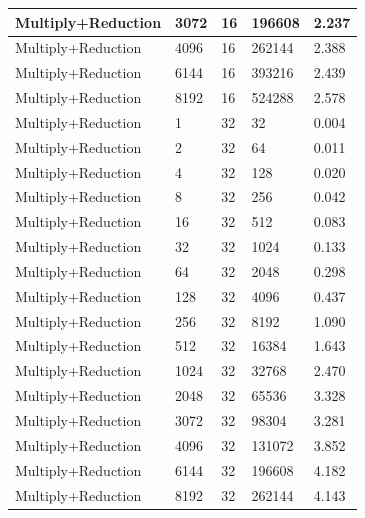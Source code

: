 \documentclass{article}
\begin{document}
\begin{longtable}{|l|l|l|l|l|}
Multiply+Reduction & 3072 & 16          & 196608            & 2.237             \\ \hline
Multiply+Reduction & 4096 & 16          & 262144            & 2.388             \\ \hline
Multiply+Reduction & 6144 & 16          & 393216            & 2.439             \\ \hline
Multiply+Reduction & 8192 & 16          & 524288            & 2.578             \\ \hline
Multiply+Reduction & 1    & 32          & 32                & 0.004             \\ \hline
Multiply+Reduction & 2    & 32          & 64                & 0.011             \\ \hline
Multiply+Reduction & 4    & 32          & 128               & 0.020             \\ \hline
Multiply+Reduction & 8    & 32          & 256               & 0.042             \\ \hline
Multiply+Reduction & 16   & 32          & 512               & 0.083             \\ \hline
Multiply+Reduction & 32   & 32          & 1024              & 0.133             \\ \hline
Multiply+Reduction & 64   & 32          & 2048              & 0.298             \\ \hline
Multiply+Reduction & 128  & 32          & 4096              & 0.437             \\ \hline
Multiply+Reduction & 256  & 32          & 8192              & 1.090             \\ \hline
Multiply+Reduction & 512  & 32          & 16384             & 1.643             \\ \hline
Multiply+Reduction & 1024 & 32          & 32768             & 2.470             \\ \hline
Multiply+Reduction & 2048 & 32          & 65536             & 3.328             \\ \hline
Multiply+Reduction & 3072 & 32          & 98304             & 3.281             \\ \hline
Multiply+Reduction & 4096 & 32          & 131072            & 3.852             \\ \hline
Multiply+Reduction & 6144 & 32          & 196608            & 4.182             \\ \hline
Multiply+Reduction & 8192 & 32          & 262144            & 4.143             \\ \hline

\end{longtable}
\end{document}
